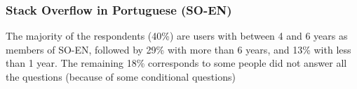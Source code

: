 \subsubsection{Stack Overflow in Portuguese (SO-EN)}
The majority of the respondents (40\%) are users with between 4 and 6 years as members of SO-EN, followed by 29\% with more than 6 years, and 13\% with less than 1 year. The remaining 18\% corresponds to some people did not answer all the questions (because of some conditional questions)




